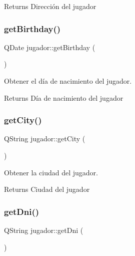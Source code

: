 \begin{DoxyReturn}{Returns}
Dirección del jugador 
\end{DoxyReturn}
\mbox{\label{classjugador_a845558cf9e7def7add1d73e9b6812865}} 
\subsubsection{\texorpdfstring{get\+Birthday()}{getBirthday()}}
{\footnotesize\ttfamily Q\+Date jugador\+::get\+Birthday (\begin{DoxyParamCaption}{ }\end{DoxyParamCaption})}



Obtener el día de nacimiento del jugador. 

\begin{DoxyReturn}{Returns}
Día de nacimiento del jugador 
\end{DoxyReturn}
\mbox{\label{classjugador_a326f8dd3d47d3fa8fdb7b38b27c47bc8}} 
\subsubsection{\texorpdfstring{get\+City()}{getCity()}}
{\footnotesize\ttfamily Q\+String jugador\+::get\+City (\begin{DoxyParamCaption}{ }\end{DoxyParamCaption})}



Obtener la ciudad del jugador. 

\begin{DoxyReturn}{Returns}
Ciudad del jugador 
\end{DoxyReturn}
\mbox{\label{classjugador_ac9609bf100bfb43e2e9582a8e69abdb5}} 
\subsubsection{\texorpdfstring{get\+Dni()}{getDni()}}
{\footnotesize\ttfamily Q\+String jugador\+::get\+Dni (\begin{DoxyParamCaption}{ }\end{DoxyParamCaption})}



